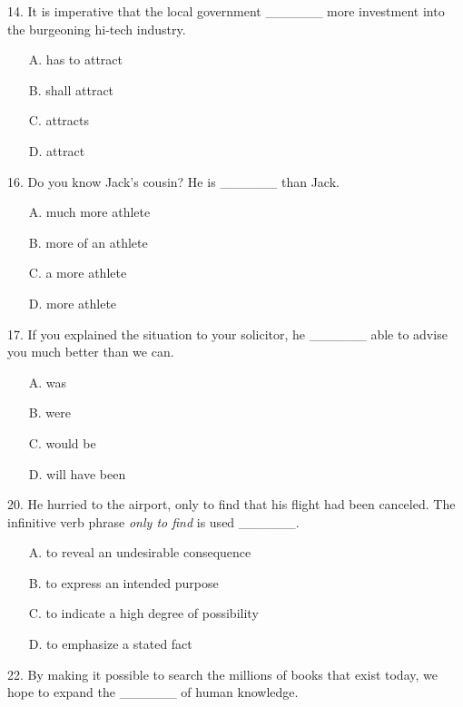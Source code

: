 \documentclass[UTF8,11pt]{ctexart}
\begin{document}
14. It is imperative that the local government \_\_\_\_\_\_ more investment into the burgeoning hi-tech industry.


\begin{itemize}[leftmargin=2em,itemsep=.2em,topsep=.4em]\item[A.] has to attract
\item[B.] shall attract
\item[C.] attracts
\item[D.] attract
\end{itemize}

16. Do you know Jack’s cousin? He is \_\_\_\_\_\_ than Jack.


\begin{itemize}[leftmargin=2em,itemsep=.2em,topsep=.4em]\item[A.] much more athlete
\item[B.] more of an athlete
\item[C.] a more athlete
\item[D.] more athlete
\end{itemize}

17. If you explained the situation to your solicitor, he \_\_\_\_\_\_ able to advise you much better than we can.


\begin{itemize}[leftmargin=2em,itemsep=.2em,topsep=.4em]\item[A.] was
\item[B.] were
\item[C.] would be
\item[D.] will have been
\end{itemize}

20. He hurried to the airport, only to find that his flight had been canceled. The infinitive verb phrase \textit{only to find} is used \_\_\_\_\_\_.


\begin{itemize}[leftmargin=2em,itemsep=.2em,topsep=.4em]\item[A.] to reveal an undesirable consequence
\item[B.] to express an intended purpose
\item[C.] to indicate a high degree of possibility
\item[D.] to emphasize a stated fact
\end{itemize}

22. By making it possible to search the millions of books that exist today, we hope to expand the \_\_\_\_\_\_ of human knowledge.
\end{document}
